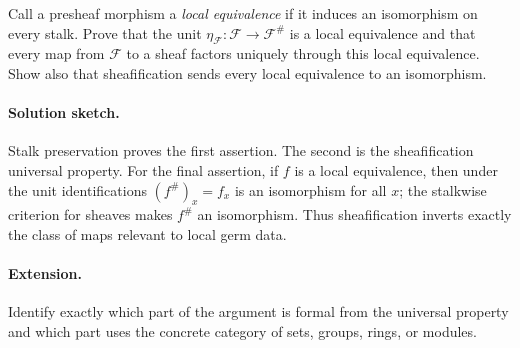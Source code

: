 \begin{problem}
Call a presheaf morphism a \emph{local equivalence} if it induces an isomorphism on every stalk. Prove that the unit $\eta_{\mathcal F}:\mathcal F\to\mathcal F^\#$ is a local equivalence and that every map from $\mathcal F$ to a sheaf factors uniquely through this local equivalence. Show also that sheafification sends every local equivalence to an isomorphism.
\end{problem}
\ifdefined\FullProblemDossiers
\paragraph{Solution sketch.}
Stalk preservation proves the first assertion. The second is the sheafification universal property. For the final assertion, if $f$ is a local equivalence, then under the unit identifications $(f^\#)_x=f_x$ is an isomorphism for all $x$; the stalkwise criterion for sheaves makes $f^\#$ an isomorphism. Thus sheafification inverts exactly the class of maps relevant to local germ data.
\paragraph{Extension.}
Identify exactly which part of the argument is formal from the universal property and which part uses the concrete category of sets, groups, rings, or modules.
\fi
